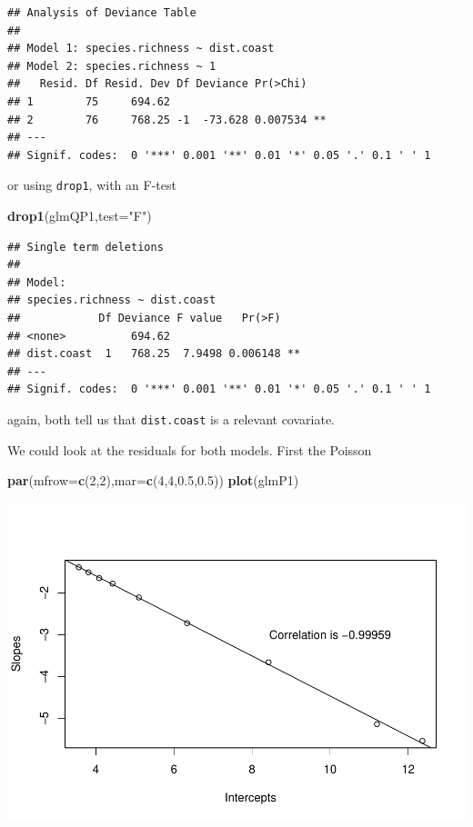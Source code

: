 \documentclass[
]{book}
\newenvironment{Shaded}{\begin{snugshade}}{\end{snugshade}}
\newcommand{\AttributeTok}[1]{\textcolor[rgb]{0.13,0.29,0.53}{#1}}
\newcommand{\DecValTok}[1]{\textcolor[rgb]{0.00,0.00,0.81}{#1}}
\newcommand{\FloatTok}[1]{\textcolor[rgb]{0.00,0.00,0.81}{#1}}
\newcommand{\FunctionTok}[1]{\textcolor[rgb]{0.13,0.29,0.53}{\textbf{#1}}}
\newcommand{\NormalTok}[1]{#1}
\newcommand{\StringTok}[1]{\textcolor[rgb]{0.31,0.60,0.02}{#1}}
\begin{document}
\begin{verbatim}
## Analysis of Deviance Table
## 
## Model 1: species.richness ~ dist.coast
## Model 2: species.richness ~ 1
##   Resid. Df Resid. Dev Df Deviance Pr(>Chi)   
## 1        75     694.62                        
## 2        76     768.25 -1  -73.628 0.007534 **
## ---
## Signif. codes:  0 '***' 0.001 '**' 0.01 '*' 0.05 '.' 0.1 ' ' 1
\end{verbatim}

or using \texttt{drop1}, with an F-test

\begin{Shaded}
\begin{Highlighting}[]
\FunctionTok{drop1}\NormalTok{(glmQP1,}\AttributeTok{test=}\StringTok{"F"}\NormalTok{)}
\end{Highlighting}
\end{Shaded}

\begin{verbatim}
## Single term deletions
## 
## Model:
## species.richness ~ dist.coast
##            Df Deviance F value   Pr(>F)   
## <none>          694.62                    
## dist.coast  1   768.25  7.9498 0.006148 **
## ---
## Signif. codes:  0 '***' 0.001 '**' 0.01 '*' 0.05 '.' 0.1 ' ' 1
\end{verbatim}

again, both tell us that \texttt{dist.coast} is a relevant covariate.

We could look at the residuals for both models. First the Poisson

\begin{Shaded}
\begin{Highlighting}[]
\FunctionTok{par}\NormalTok{(}\AttributeTok{mfrow=}\FunctionTok{c}\NormalTok{(}\DecValTok{2}\NormalTok{,}\DecValTok{2}\NormalTok{),}\AttributeTok{mar=}\FunctionTok{c}\NormalTok{(}\DecValTok{4}\NormalTok{,}\DecValTok{4}\NormalTok{,}\FloatTok{0.5}\NormalTok{,}\FloatTok{0.5}\NormalTok{))}
\FunctionTok{plot}\NormalTok{(glmP1)}
\end{Highlighting}
\end{Shaded}

\includegraphics{ECOMODbook_files/figure-latex/unnamed-chunk-80-1.pdf}
\end{document}

